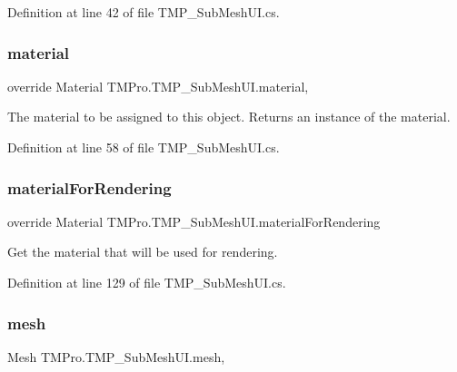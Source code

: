 Definition at line 42 of file T\+M\+P\+\_\+\+Sub\+Mesh\+U\+I.\+cs.

\mbox{\label{class_t_m_pro_1_1_t_m_p___sub_mesh_u_i_a6bd5b75c3ee5ddfdda01f26c7052bb97}} 
\subsubsection{\texorpdfstring{material}{material}}
{\footnotesize\ttfamily override Material T\+M\+Pro.\+T\+M\+P\+\_\+\+Sub\+Mesh\+U\+I.\+material\hspace{0.3cm}{\ttfamily [get]}, {\ttfamily [set]}}



The material to be assigned to this object. Returns an instance of the material. 



Definition at line 58 of file T\+M\+P\+\_\+\+Sub\+Mesh\+U\+I.\+cs.

\mbox{\label{class_t_m_pro_1_1_t_m_p___sub_mesh_u_i_acf8eb0b73fe8fe9f4b12d71550739bb1}} 
\subsubsection{\texorpdfstring{materialForRendering}{materialForRendering}}
{\footnotesize\ttfamily override Material T\+M\+Pro.\+T\+M\+P\+\_\+\+Sub\+Mesh\+U\+I.\+material\+For\+Rendering\hspace{0.3cm}{\ttfamily [get]}}



Get the material that will be used for rendering. 



Definition at line 129 of file T\+M\+P\+\_\+\+Sub\+Mesh\+U\+I.\+cs.

\mbox{\label{class_t_m_pro_1_1_t_m_p___sub_mesh_u_i_a90820457f70262482c28723f1265876a}} 
\subsubsection{\texorpdfstring{mesh}{mesh}}
{\footnotesize\ttfamily Mesh T\+M\+Pro.\+T\+M\+P\+\_\+\+Sub\+Mesh\+U\+I.\+mesh\hspace{0.3cm}{\ttfamily [get]}, {\ttfamily [set]}}



